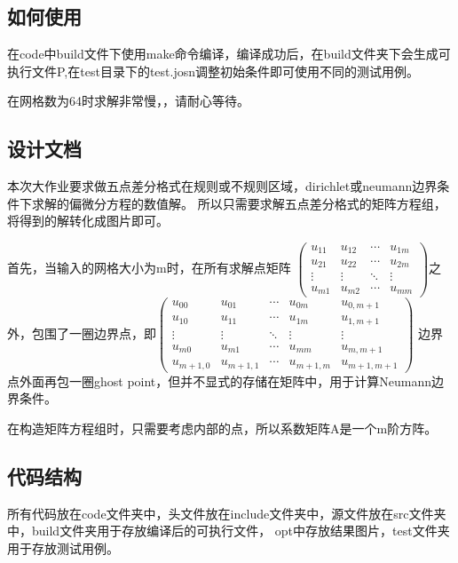 \documentclass[UTF8]{ctexart}
\begin{document}
\pagestyle{fancy}
\fancyhead{}
\rhead{\today}



\subsection*{如何使用}
在code中build文件下使用make命令编译，编译成功后，在build文件夹下会生成可执行文件P,在test目录下的test.josn调整初始条件即可使用不同的测试用例。

在网格数为64时求解非常慢，，请耐心等待。

\subsection*{设计文档}
本次大作业要求做五点差分格式在规则或不规则区域，dirichlet或neumann边界条件下求解的偏微分方程的数值解。
所以只需要求解五点差分格式的矩阵方程组，将得到的解转化成图片即可。

首先，当输入的网格大小为m时，在所有求解点矩阵
$
\begin{pmatrix}
u_{11} & u_{12} & \cdots & u_{1m} \\
u_{21} & u_{22} & \cdots & u_{2m} \\
\vdots & \vdots & \ddots & \vdots \\
u_{m1} & u_{m2} & \cdots & u_{mm}
\end{pmatrix}
$之外，包围了一圈边界点，即$
\begin{pmatrix}
    u_{00} & u_{01} & \cdots & u_{0m} &u_{0,m+1}\\
    u_{10} & u_{11} & \cdots & u_{1m} &u_{1,m+1}\\
    \vdots & \vdots & \ddots & \vdots & \vdots \\
    u_{m0} & u_{m1} & \cdots & u_{mm} &u_{m,m+1}\\
    u_{m+1,0} & u_{m+1,1} & \cdots & u_{m+1,m} &u_{m+1,m+1}
\end{pmatrix}$
边界点外面再包一圈ghost point，但并不显式的存储在矩阵中，用于计算Neumann边界条件。

在构造矩阵方程组时，只需要考虑内部的点，所以系数矩阵A是一个m阶方阵。

\subsection*{代码结构}
所有代码放在code文件夹中，头文件放在include文件夹中，源文件放在src文件夹中，build文件夹用于存放编译后的可执行文件，
opt中存放结果图片，test文件夹用于存放测试用例。
\end{document}
